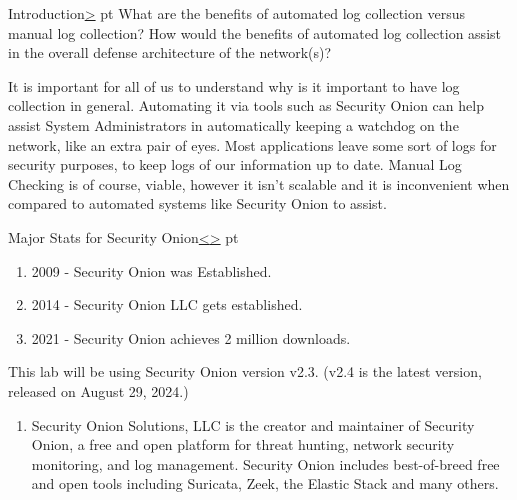 \documentclass[12pt]{article}
\newenvironment{instructionblock}{\Large\bgroup}{\egroup}
\begin{document}
\pagebreak


\pagebreak
\begin{slide}{Introduction}{\hyperref[slide 2]{\textgreater}}
 pt
\begin{instructionblock}
What are the benefits of automated log collection versus manual log collection? How would the benefits of automated log collection assist in the overall defense architecture of the network(s)?
\end{instructionblock}
\end{slide}

\vfill

It is important for all of us to understand why is it important to have log collection in general. Automating it via tools such as Security Onion can help assist System Administrators in automatically keeping a watchdog on the network, like an extra pair of eyes. Most applications leave some sort of logs for security purposes, to keep logs of our information up to date. Manual Log Checking is of course, viable, however it isn't scalable and it is inconvenient when compared to automated systems like Security Onion to assist. 



\pagebreak
\begin{slide}{Major Stats for Security Onion}{\hyperref[slide 1]{\textless}\hyperref[slide 3]{\textgreater}}
 pt
\begin{instructionblock}
\begin{enumerate}
	\item 2009 - Security Onion was Established. \cite{yahoo}
	\item 2014 - Security Onion LLC gets established.
	\item 2021 - Security Onion achieves 2 million downloads.
\end{enumerate}

This lab will be using Security Onion version v2.3. (v2.4 is the latest version, released on August 29, 2024.)
\end{instructionblock}
\end{slide}
\vfill

\begin{enumerate}
	\item Security Onion Solutions, LLC is the creator and maintainer of Security Onion, a free and open platform for threat hunting, network security monitoring, and log management. Security Onion includes best-of-breed free and open tools including Suricata, Zeek, the Elastic Stack and many others. \cite{yahoo}
	
\end{enumerate}
\end{document}
